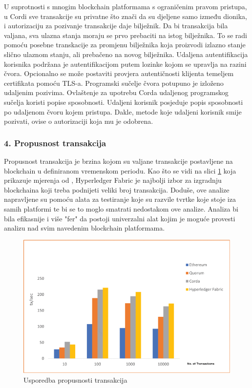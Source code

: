 \documentclass[times, utf8, diplomski]{fer}
\begin{document}
U suprotnosti s mnogim blockchain platformama s ograničenim pravom pristupa, u Cordi sve transakcije su privatne što znači da su djeljene samo između dionika, i autorizaciju za pozivanje transakcije daje bilježnik. Da bi transakcija bila valjana, sva ulazna stanja moraju se prvo prebaciti na istog bilježnika. To se radi pomoću posebne transkacije za promjenu bilježnika koja proizvodi izlazno stanje slično ulaznom stanju,  ali prebačeno na novog bilježnika. 
Udaljena autentifikacija korisnika podržana je autentifikacijom putem lozinke kojom se upravlja na razini čvora. Opcionalno se može postaviti provjera autentičnosti klijenta temeljem certifikata pomoću TLS-a. Programski sučelje čvora potupuno je izloženo udaljenim pozivima. Ovlaštenje za upotrebu Corda udaljenog programskog sučelja koristi popise sposobnosti. Udaljeni korisnik posjeduje popis sposobnosti po udaljenom čvoru kojem pristupa. Dakle, metode koje udaljeni korisnik smije pozivati, ovise o autorizaciji koja mu je odobrena.

\subsubsection{4.  Propusnost transakcija}

Propusnost transakcija je brzina kojom su valjane transakcije postavljene na blockchain u definiranom vremenskom periodu. Kao što se vidi na slici \ref{fig:usporedba} koja prikazuje mjerenja od \citep{9411380}, Hyperledger Fabric je najbolji izbor za izgradnju blockchaina koji treba podnijeti veliki broj transakcija. Doduše, ove analize napravljene su pomoću alata za testiranje koje su razvile tvrtke koje stoje iza samih platformi te bi se to moglo smatrati nedostakom ove analize. Analiza bi bila efikasnije i više "fer" da postoji univerzalni alat kojim je moguće provesti analizu nad svim navedenim blockchain platformama.

\begin{figure}[htb]
\centering
\includegraphics[width=12cm]{imgs/monra10-CSDE92-large.png}
\caption{Usporedba propusnosti transakcija}
\label{fig:usporedba}
\end{figure}
\end{document}
